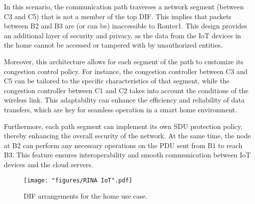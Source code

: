 \documentclass{ieeeaccess}
\begin{document}
In this scenario, the communication path traverses a network segment (between C3 and C5) that is not a member of the top DIF. This implies that packets between B2 and B3 are (or can be) inaccessible to Router1. This design provides an additional layer of security and privacy, as the data from the IoT devices in the home cannot be accessed or tampered with by unauthorized entities.

Moreover, this architecture allows for each segment of the path to customize its congestion control policy. For instance, the congestion controller between C3 and C5 can be tailored to the specific characteristics of that segment, while the congestion controller between C1 and C2 takes into account the conditions of the wireless link. This adaptability can enhance the efficiency and reliability of data transfers, which are key for seamless operation in a smart home environment.

Furthermore, each path segment can implement its own SDU protection policy, thereby enhancing the overall security of the network. At the same time, the node at B2 can perform any necessary operations on the PDU sent from B1 to reach B3. This feature ensures interoperability and smooth communication between IoT devices and the cloud servers.




\begin{figure}[!t]
	\centering
	\texttt{[image: "figures/RINA IoT".pdf]}
	\caption{DIF arrangements for the home use case.}
	\label{fig:rina-iot}
\end{figure}
\end{document}
